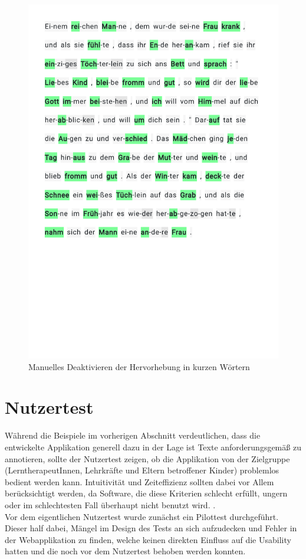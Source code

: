 \begin{figure}[h!]
	\centering
	\includegraphics[width=.7\linewidth, frame]{figures/evaluation/annotation5}
	\caption{Manuelles Deaktivieren der Hervorhebung in kurzen Wörtern}
	\label{fig:evaluation-ex5}
\end{figure}
\newpage

\section{Nutzertest}

Während die Beispiele im vorherigen Abschnitt verdeutlichen, dass die entwickelte Applikation generell dazu in der Lage ist Texte anforderungsgemäß zu annotieren, sollte der Nutzertest zeigen, ob die Applikation von der Zielgruppe (LerntherapeutInnen, Lehrkräfte und Eltern betroffener Kinder) problemlos bedient werden kann. Intuitivität und Zeiteffizienz sollten dabei vor Allem berücksichtigt werden, da Software, die diese Kriterien schlecht erfüllt, ungern oder im schlechtesten Fall überhaupt nicht benutzt wird. .\\
Vor dem eigentlichen Nutzertest wurde zunächst ein Pilottest durchgeführt. Dieser half dabei, Mängel im Design des Tests an sich aufzudecken und Fehler in der Webapplikation zu finden, welche keinen direkten Einfluss auf die Usability hatten und die noch vor dem Nutzertest behoben werden konnten.

